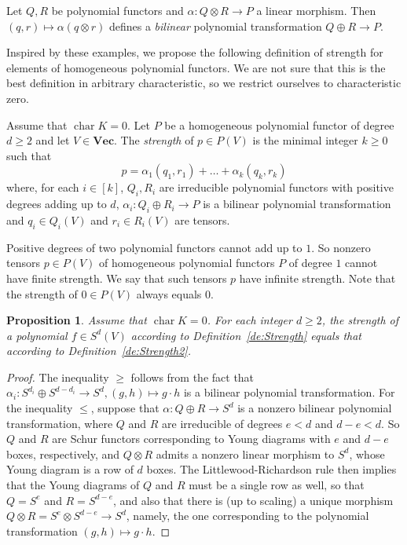 \documentclass{amsart}
\theoremstyle{plain}
\newtheorem{prop}[thm]{Proposition}
\theoremstyle{definition}
\DeclareMathOperator{\cha}{char}
\renewcommand{\Vec}{\mathbf{Vec}}
\begin{document}
\begin{ex}
Let $Q,R$ be polynomial functors and $\alpha\colon Q\otimes R\to P$ a linear morphism. Then $(q,r)\mapsto \alpha(q\otimes r)$ defines a {\em bilinear} polynomial transformation $Q\oplus R\to P$.
\end{ex}

Inspired by these examples, we propose the following definition of strength
for elements of homogeneous polynomial functors. We are not sure that
this is the best definition in arbitrary characteristic, so we restrict
ourselves to characteristic zero.

\begin{de}\label{de:Strength2}
Assume that $\cha K=0$. Let $P$ be a homogeneous polynomial functor
of degree $d\geq 2$ and let $V \in \Vec$. The {\em strength} of $p \in P(V)$
is the minimal integer $k\geq0$ such that
\[
p=\alpha_1(q_1,r_1)+\ldots+\alpha_k(q_k,r_k)
\]
where, for each $i\in[k]$, $Q_i,R_i$ are irreducible polynomial functors with positive degrees adding up to $d$, $\alpha_i\colon Q_i \oplus R_i \to P$ is a bilinear polynomial transformation and $q_i \in Q_i(V)$ and $r_i \in R_i(V)$ are tensors.
\end{de}

\begin{re}
Positive degrees of two polynomial functors cannot add up to $1$. So nonzero tensors $p\in P(V)$ of homogeneous polynomial functors $P$ of degree $1$ cannot have finite strength. We say that such tensors $p$ have infinite strength. Note that the strength of $0\in P(V)$ always equals $0$.
\end{re}

\begin{prop}
Assume that $\cha K=0$. For each integer $d\geq 2$, the strength of a polynomial
$f \in S^d(V)$ according to Definition~\ref{de:Strength} equals that
according to Definition~\ref{de:Strength2}.
\end{prop}
\begin{proof}
The inequality $\geq$ follows from the fact that $\alpha_i\colon S^{d_i}
\oplus S^{d-d_i} \to S^d,(g,h)\mapsto g\cdot h$ is a bilinear polynomial transformation. For the inequality $\leq$, suppose
that $\alpha\colon Q \oplus R \to S^d$ is a nonzero bilinear polynomial
transformation, where $Q$ and $R$ are irreducible of degrees $e<d$
and $d-e<d$. So $Q$ and $R$ are Schur functors corresponding to
Young diagrams with $e$ and $d-e$ boxes, respectively, and $Q \otimes
R$ admits a nonzero linear morphism to $S^d$, whose Young diagram is a row of $d$ boxes. The
Littlewood-Richardson rule then implies that the Young diagrams of $Q$
and $R$ must be a single row as well, so that $Q=S^e$ and $R=S^{d-e}$,
and also that there is (up to scaling) a unique morphism $Q \otimes R
= S^e \otimes S^{d-e} \to S^d$, namely, the one corresponding to the
polynomial transformation $(g,h) \mapsto g\cdot h$.
\end{proof}
\end{document}
